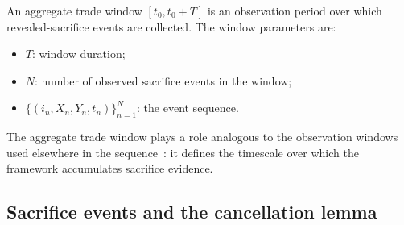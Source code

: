\begin{definition}
\label{def:trade_window}
An aggregate trade window $[t_0, t_0 + T]$ is an observation
period over which revealed-sacrifice events are collected.  The
window parameters are:
\begin{itemize}
\item $T$: window duration;
\item $N$: number of observed sacrifice events in the window;
\item $\{(i_n, X_n, Y_n, t_n)\}_{n=1}^N$: the event sequence.
\end{itemize}
The aggregate trade window plays a role analogous to the
observation windows used elsewhere in the
sequence~\citep[SCM]{lasser2026scm}: it defines the timescale
over which the framework accumulates sacrifice evidence.
\end{definition}

\subsection{Sacrifice events and the cancellation lemma}
\label{sec:sacrifice_events}

